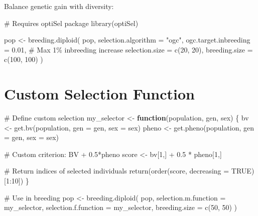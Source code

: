 \documentclass[
  letterpaper,
]{book}
\newenvironment{Shaded}{\begin{snugshade}}{\end{snugshade}}
\newcommand{\AttributeTok}[1]{\textcolor[rgb]{0.40,0.45,0.13}{#1}}
\newcommand{\CommentTok}[1]{\textcolor[rgb]{0.37,0.37,0.37}{#1}}
\newcommand{\ConstantTok}[1]{\textcolor[rgb]{0.56,0.35,0.01}{#1}}
\newcommand{\ControlFlowTok}[1]{\textcolor[rgb]{0.00,0.23,0.31}{\textbf{#1}}}
\newcommand{\DecValTok}[1]{\textcolor[rgb]{0.68,0.00,0.00}{#1}}
\newcommand{\FloatTok}[1]{\textcolor[rgb]{0.68,0.00,0.00}{#1}}
\newcommand{\FunctionTok}[1]{\textcolor[rgb]{0.28,0.35,0.67}{#1}}
\newcommand{\NormalTok}[1]{\textcolor[rgb]{0.00,0.23,0.31}{#1}}
\newcommand{\OtherTok}[1]{\textcolor[rgb]{0.00,0.23,0.31}{#1}}
\newcommand{\SpecialCharTok}[1]{\textcolor[rgb]{0.37,0.37,0.37}{#1}}
\newcommand{\StringTok}[1]{\textcolor[rgb]{0.13,0.47,0.30}{#1}}
\begin{document}
Balance genetic gain with diversity:

\begin{Shaded}
\begin{Highlighting}[]
\CommentTok{\# Requires optiSel package}
\FunctionTok{library}\NormalTok{(optiSel)}

\NormalTok{pop }\OtherTok{\textless{}{-}} \FunctionTok{breeding.diploid}\NormalTok{(}
\NormalTok{  pop,}
  \AttributeTok{selection.algorithm =} \StringTok{"ogc"}\NormalTok{,}
  \AttributeTok{ogc.target.inbreeding =} \FloatTok{0.01}\NormalTok{,  }\CommentTok{\# Max 1\% inbreeding increase}
  \AttributeTok{selection.size =} \FunctionTok{c}\NormalTok{(}\DecValTok{20}\NormalTok{, }\DecValTok{20}\NormalTok{),}
  \AttributeTok{breeding.size =} \FunctionTok{c}\NormalTok{(}\DecValTok{100}\NormalTok{, }\DecValTok{100}\NormalTok{)}
\NormalTok{)}
\end{Highlighting}
\end{Shaded}

\section{Custom Selection Function}\label{custom-selection-function}

\begin{Shaded}
\begin{Highlighting}[]
\CommentTok{\# Define custom selection}
\NormalTok{my\_selector }\OtherTok{\textless{}{-}} \ControlFlowTok{function}\NormalTok{(population, gen, sex) \{}
\NormalTok{  bv }\OtherTok{\textless{}{-}} \FunctionTok{get.bv}\NormalTok{(population, }\AttributeTok{gen =}\NormalTok{ gen, }\AttributeTok{sex =}\NormalTok{ sex)}
\NormalTok{  pheno }\OtherTok{\textless{}{-}} \FunctionTok{get.pheno}\NormalTok{(population, }\AttributeTok{gen =}\NormalTok{ gen, }\AttributeTok{sex =}\NormalTok{ sex)}

  \CommentTok{\# Custom criterion: BV + 0.5*pheno}
\NormalTok{  score }\OtherTok{\textless{}{-}}\NormalTok{ bv[}\DecValTok{1}\NormalTok{,] }\SpecialCharTok{+} \FloatTok{0.5} \SpecialCharTok{*}\NormalTok{ pheno[}\DecValTok{1}\NormalTok{,]}

  \CommentTok{\# Return indices of selected individuals}
  \FunctionTok{return}\NormalTok{(}\FunctionTok{order}\NormalTok{(score, }\AttributeTok{decreasing =} \ConstantTok{TRUE}\NormalTok{)[}\DecValTok{1}\SpecialCharTok{:}\DecValTok{10}\NormalTok{])}
\NormalTok{\}}

\CommentTok{\# Use in breeding}
\NormalTok{pop }\OtherTok{\textless{}{-}} \FunctionTok{breeding.diploid}\NormalTok{(}
\NormalTok{  pop,}
  \AttributeTok{selection.m.function =}\NormalTok{ my\_selector,}
  \AttributeTok{selection.f.function =}\NormalTok{ my\_selector,}
  \AttributeTok{breeding.size =} \FunctionTok{c}\NormalTok{(}\DecValTok{50}\NormalTok{, }\DecValTok{50}\NormalTok{)}
\NormalTok{)}
\end{Highlighting}
\end{Shaded}
\end{document}

